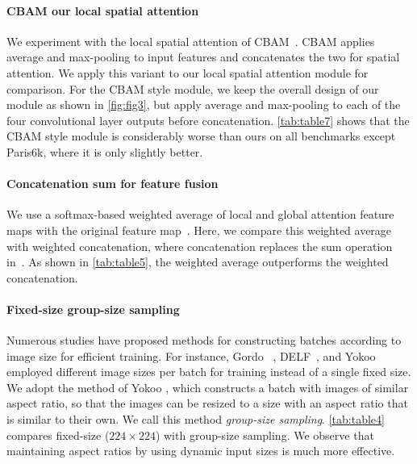 
\paragraph{CBAM \vs our local spatial attention}

We experiment with the local spatial attention of CBAM~\cite{woo01}. CBAM applies average and max-pooling to input features and concatenates the two for spatial attention. We apply this variant to our local spatial attention module for comparison. For the CBAM style module, we keep the overall design of our module as shown in \autoref{fig:fig3}, but apply average and max-pooling to each of the four convolutional layer outputs before concatenation. \autoref{tab:table7} shows that the CBAM style module is considerably worse than ours on all benchmarks except Paris6k, where it is only slightly better.


\paragraph{Concatenation \vs sum for feature fusion}

We use a softmax-based weighted average of local and global attention feature maps with the original feature map~. Here, we compare this weighted average with weighted concatenation, where concatenation replaces the sum operation in~. As shown in \autoref{tab:table5}, the weighted average outperforms the weighted concatenation.


\paragraph{Fixed-size \vs group-size sampling}

Numerous studies have proposed methods for constructing batches according to image size for efficient training. For instance, Gordo \etal~\cite{Gordo01}, DELF~\cite{Noh01}, and Yokoo~\etal\cite{Yokoo01} employed different image sizes per batch for training instead of a single fixed size. We adopt the method of Yokoo \etal, which constructs a batch with images of similar aspect ratio, so that the images can be resized to a size with an aspect ratio that is similar to their own. We call this method \emph{group-size sampling}. \autoref{tab:table4} compares fixed-size ($224 \times 224$) with group-size sampling. We observe that maintaining aspect ratios by using dynamic input sizes is much more effective.

